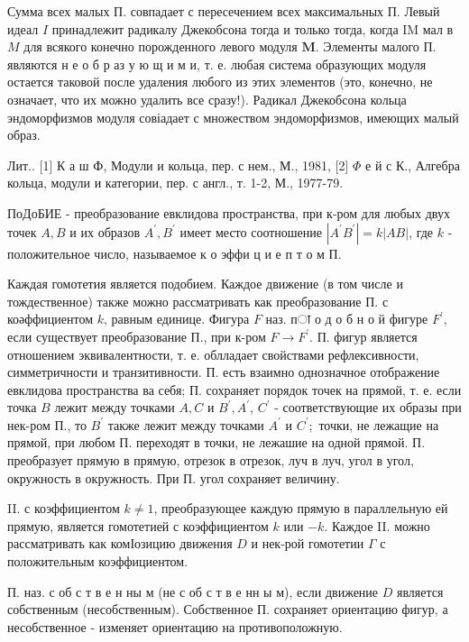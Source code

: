 \documentclass[10pt]{article}
\begin{document}
Сумма всех малых П. совпадает с пересечением всех максимальных П. Левый идеал $I$ принадлежит радикалу Джекобсона тогда и только тогда, когда IM мал в $M$ для всякого конечно порожденного левого модуля $\boldsymbol{M}$. Элементы малого П. являются н е о б р аз у ю щ и м и, т. е. любая система образующих модуля остается таковой после удаления любого из этих элементов (это, конечно, не означает, что их можно удалить все сразу!). Радикал Джекобсона кольца эндоморфизмов модуля совіадает с множеством эндоморфизмов, имеющих малый образ.



Лит.. [1] К а ш Ф, Модули и кольца, пер. с нем., М., 1981, [2] $\Phi$ е й с К., Алгебра кольца, модули и категории, пер. с англ., т. 1-2, М., 1977-79.



ПоДоБИЕ - преобразование евклидова пространства, при к-ром для любых двух точек $A, B$ и их образов $A^{\prime}, B^{\prime}$ имеет место соотношение $\left|A^{\prime} B^{\prime}\right|=k|A B|$, где $k$ - положительное число, называемое к о эффи ц и е п т о м П.



Каждая гомотетия является подобием. Каждое движение (в том числе и тождественное) также можно рассматривать как преобразование П. с коәффициентом $k$, равным единице. Фигура $F$ наз. пा о д о б н о й фигуре $F^{\prime}$, если существует преобразование П., при к-ром $F \rightarrow F^{\prime}$. П. фигур является отношением эквивалентности, т. е. облладает свойствами рефлексивности, симметричности и транзитивности. П. есть взаимно однозначное отображение евклидова пространства ва себя; П. сохраняет порядок точек на прямой, т. е. если точка $B$ лежит между точками $A, C$ и $B^{\prime}, A^{\prime}$, $C^{\prime}$ - соответствующие их образы при нек-ром П., то $B^{\prime}$ также лежит между точками $A^{\prime}$ и $C^{\prime} ;$ точки, не лежащие на прямой, при любом П. переходят в точки, не лежашие на одной прямой. П. преобразует прямую в прямую, отрезок в отрезок, луч в луч, угол в угол, окружность в окружность. При П. угол сохраняет величину.



II. с коэффициентом $k \neq 1$, преобразующее каждую прямую в параллельную ей прямую, является гомотетией с коэффициентом $k$ или $-k$. Каждое II. можно рассматривать как комІозицию движения $D$ и нек-рой гомотетии $\Gamma$ с положительным коэффициентом.



П. наз. с об с т в е н ны м (не с об с т в е нн ы м), если движение $D$ является собственным (несобственным). Собственное П. сохраняет ориентацию фигур, а несобственное - изменяет ориентацию на противоположную.
\end{document}
